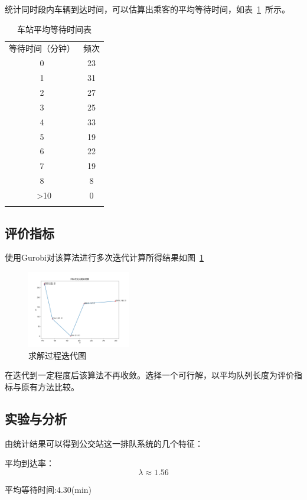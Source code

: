 统计同时段内车辆到达时间，可以估算出乘客的平均等待时间，如表~\ref{teble_2}~所示。
\begin{table}[htbp!]
    \centering
    \caption{车站平均等待时间表}\label{teble_2}
    \begin{tabular}{cc}
        \whline
        等待时间（分钟） & 频次 \\
        0 & 23\\
        1 & 31\\
        2 & 27\\
        3 & 25\\
        4 & 33\\
        5 & 19\\
        6 & 22\\
        7 & 19\\
        8 & 8\\\
        >10&0 \\
        \whline
    \end{tabular}
\end{table}

\subsection{评价指标}
使用Gurobi对该算法进行多次迭代计算所得结果如图~\ref{fig44}~
\begin{figure}[htbp!]
    \centering
    \includegraphics[width=0.4\textwidth]{figs/chap04/myplot.png}
    \caption{求解过程迭代图}
    \label{fig44}
\end{figure}

在迭代到一定程度后该算法不再收敛。选择一个可行解，以平均队列长度为评价指标与原有方法比较。

\subsection{实验与分析}

由统计结果可以得到公交站这一排队系统的几个特征：

平均到达率：$$\lambda \approx 1.56$$ 

平均等待时间:4.30(min)

